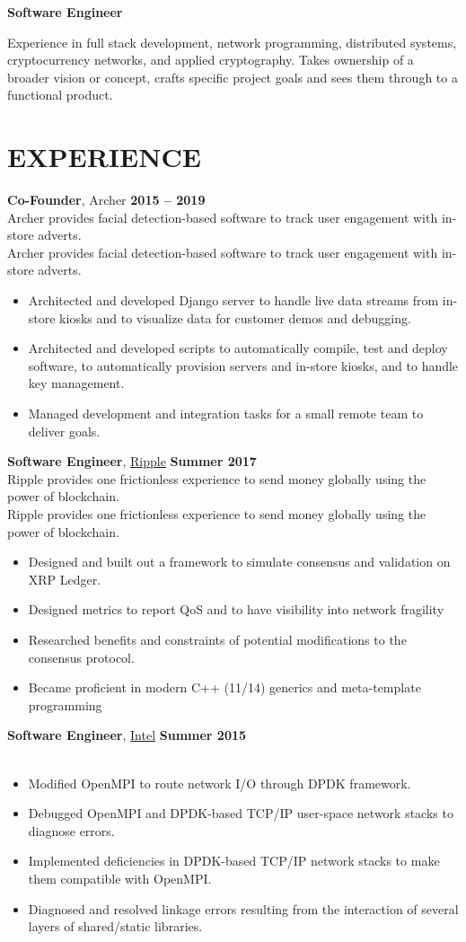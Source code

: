 \documentclass[10pt, center]{res} %
\newcommand{\pad}{\vspace{2pt}}
\newcommand{\unpad}{\vspace{-2pt}}
\newcommand{\bullets}[1]{
	\begin{itemize}[noitemsep]
		#1
	\end{itemize}
	\vspace{-6pt}
}
\newcommand{\experience}[5]{
	{\bf #1}, #2 \hfill {\bf #3} \\ \vspace{-10pt}
	\ifx\hfbuzz#4\hfbuzz
		\vspace{-4pt}
	\else
		{\vspace{-4pt} \\ #4}
	\fi
	\bullets{#5}
}
\begin{document}
\newcommand{\email}{\href{mailto:jmmcgee.00@gmail.com}{jmmcgee.00@gmail.com} }
\newcommand{\phone}{\href{tel:+1-323-557-8647}{(323) 557-8647} }
\address{\email | \phone}
\begin{resume}

\pad
\centerline{\textbf{\huge Software Engineer}}
\parbox{\textwidth}{
	Experience in full stack development, network programming, distributed systems, cryptocurrency networks, and applied cryptography. Takes ownership of a broader vision or concept, crafts specific project goals and sees them through to a functional product.
}

\unpad
\section{EXPERIENCE}
	\experience{Co-Founder}{Archer}{2015 -- 2019}{
	Archer provides facial detection-based software to track user engagement with in-store adverts.}{
		\item Architected and developed Django server to handle live data streams from in-store kiosks and to visualize data for customer demos and debugging.
		\item Architected and developed scripts to automatically compile, test and deploy software, to automatically provision servers and in-store kiosks, and to handle key management.
		\item Managed development and integration tasks for a small remote team to deliver goals.
	}

    \experience{Software Engineer}{\href{https://ripple.com/}{Ripple}}{Summer 2017}{
   	Ripple provides one frictionless experience to send money globally using the power of blockchain.}{
		\item Designed and built out a framework to simulate consensus and validation on XRP Ledger.
		\item Designed metrics to report QoS and  to have visibility into network fragility
		\item Researched benefits and constraints of potential modifications to the consensus protocol.
		\item Became proficient in modern C++ (11/14) generics and meta-template programming
    }

    \experience{Software Engineer}{\href{https://www.intel.com}{Intel}}{Summer 2015}{}{
		\item Modified OpenMPI to route network I/O through DPDK framework.
		\item Debugged OpenMPI and DPDK-based TCP/IP user-space network stacks to diagnose errors.
		\item Implemented deficiencies in DPDK-based TCP/IP network stacks to make them compatible with OpenMPI.
		\item Diagnosed and resolved linkage errors resulting from the interaction of several layers of shared/static libraries.
    }


\end{resume}
\end{document}
